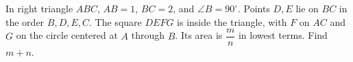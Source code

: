 In right triangle $ABC$, $AB=1$, $BC=2$, and $\angle B=90^\circ$. Points $D,E$ lie on $BC$ in the order $B,D,E,C$. The square $DEFG$ is inside the triangle, with $F$ on $AC$ and $G$ on the circle centered at $A$ through $B$. Its area is $\dfrac{m}{n}$ in lowest terms. Find $m+n$.
